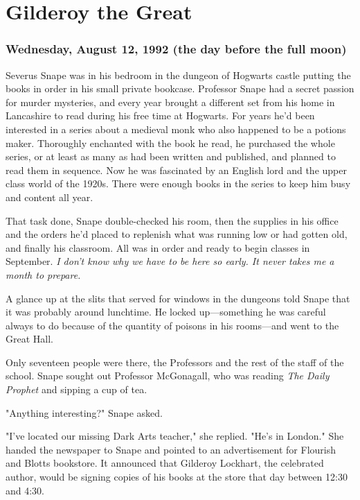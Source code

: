 
\chapter{Gilderoy the Great}

\subsection{Wednesday, August 12, 1992 (the day before the full moon)}

Severus Snape was in his bedroom in the dungeon of Hogwarts castle putting the books in order in his small private bookcase. Professor Snape had a secret passion for murder mysteries, and every year brought a different set from his home in Lancashire to read during his free time at Hogwarts. For years he'd been interested in a series about a medieval monk who also happened to be a potions maker. Thoroughly enchanted with the book he read, he purchased the whole series, or at least as many as had been written and published, and planned to read them in sequence. Now he was fascinated by an English lord and the upper class world of the 1920s. There were enough books in the series to keep him busy and content all year.

That task done, Snape double-checked his room, then the supplies in his office and the orders he'd placed to replenish what was running low or had gotten old, and finally his classroom. All was in order and ready to begin classes in September. \emph{I don't know why we have to be here so early. It never takes me a month to prepare.}

A glance up at the slits that served for windows in the dungeons told Snape that it was probably around lunchtime. He locked up—something he was careful always to do because of the quantity of poisons in his rooms—and went to the Great Hall.

Only seventeen people were there, the Professors and the rest of the staff of the school. Snape sought out Professor McGonagall, who was reading \emph{The Daily Prophet} and sipping a cup of tea.

"Anything interesting?" Snape asked.

"I've located our missing Dark Arts teacher," she replied. "He's in London." She handed the newspaper to Snape and pointed to an advertisement for Flourish and Blotts bookstore. It announced that Gilderoy Lockhart, the celebrated author, would be signing copies of his books at the store that day between 12:30 and 4:30.

